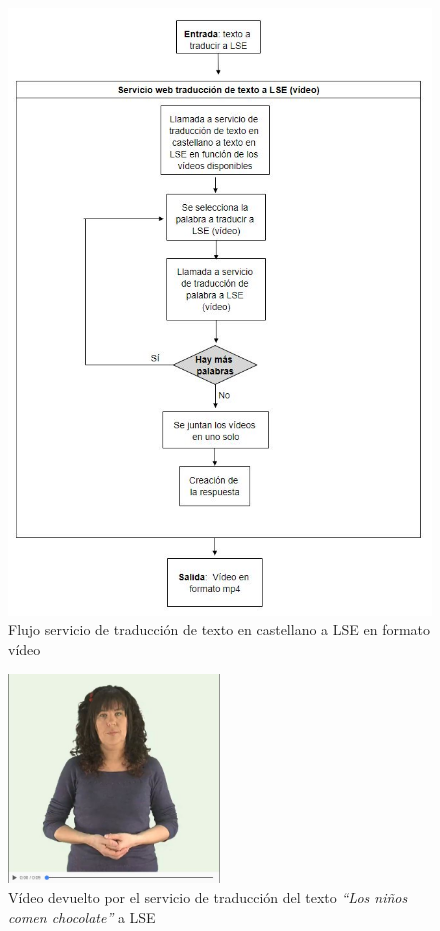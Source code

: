 \begin{figure}[]
	\centering
	\includegraphics[width=1\textwidth]{Imagenes/Fuentes/Text2LSE/FlujoVideoTexto.jpg}
	\caption{ Flujo servicio de traducción de texto en castellano a LSE en formato vídeo }
	\label {fig: imgFlujoVideoTextoText2LSE}
\end{figure}

\begin{figure}[]
	\centering
	\includegraphics[width=0.5\textwidth]{Imagenes/Fuentes/Text2LSE/videoOracion.jpg}
	\caption{Vídeo devuelto por el servicio de traducción del texto \textit{``Los niños comen chocolate''} a LSE}
	\label {fig: videoOracion}
\end{figure}




